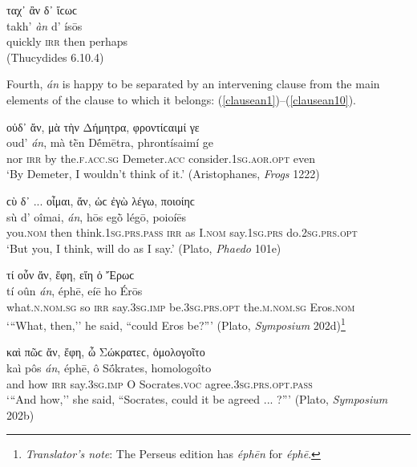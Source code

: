 \begin{exe}
\ex ταχ᾽ ἂν δ᾽ ἴϲωϲ\\
\gll takh' \emph{àn} d' ísōs\\
quickly \textsc{irr} then perhaps\\
\trans (Thucydides 6.10.4)
\label{dean2}
\end{exe}

Fourth, \emph{án} is happy to be separated by an intervening clause from the main elements of the clause to which it belongs: (\ref{clausean1})--(\ref{clausean10}).

\begin{exe}
\ex οὐδ᾽ ἄν, μὰ τὴν Δήμητρα, φροντίϲαιμί γε\\
\gll oud' \emph{án}, mà tḕn Dḗmētra, phrontísaimí ge\\
nor \textsc{irr} by the.\textsc{f.acc.sg} Demeter.\textsc{acc} consider.\textsc{1sg.aor.opt} even\\
\trans `By Demeter, I wouldn't think of it.' (Aristophanes, \textit{Frogs} 1222)
\label{clausean1}
\end{exe}

\begin{exe}
\ex ϲὺ δ᾽ ... οἶμαι, ἄν, ὡϲ ἐγὼ λέγω, ποιοίηϲ\\
\gll sù d' oîmai, \emph{án}, hōs egṑ légō, poioíēs\\
you.\textsc{nom} then think.\textsc{1sg.prs.pass} \textsc{irr} as I.\textsc{nom} say.\textsc{1sg.prs} do.\textsc{2sg.prs.opt}\\
\trans `But you, I think, will do as I say.' (Plato, \textit{Phaedo} 101e)
\label{clausean2}
\end{exe}

\begin{exe}
\ex τί οὖν ἄν, ἔφη, εἴη ὁ Ἔρωϲ\\
\gll tí oûn \emph{án}, éphē, eíē ho Érōs\\
what.\textsc{n.nom.sg} so \textsc{irr} say.\textsc{3sg.imp} be.\textsc{3sg.prs.opt} the.\textsc{m.nom.sg} Eros.\textsc{nom}\\
\trans `{``}What, then,'' he said, ``could Eros be?''' (Plato, \textit{Symposium} 202d)\footnote{\emph{Translator's note}: The Perseus edition has \textit{éphēn} for \textit{éphē}.}
\label{clausean3}
\end{exe}

\begin{exe}
\ex καὶ πῶϲ ἄν, ἔφη, ὦ Σώκρατεϲ, ὁμολογοῖτο\\
\gll kaì pôs \emph{án}, éphē, ô Sṓkrates, homologoîto\\
and how \textsc{irr} say.\textsc{3sg.imp} O Socrates.\textsc{voc} agree.\textsc{3sg.prs.opt.pass}\\
\trans `{``}And how,'' she said, ``Socrates, could it be agreed ... ?''' (Plato, \textit{Symposium} 202b)
\label{clausean4}
\end{exe}

